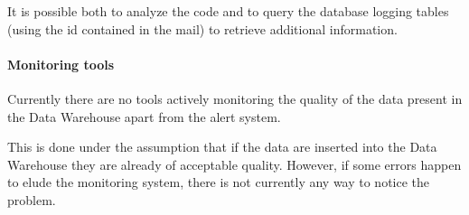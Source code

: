             It is possible both to analyze the code and to query the database logging tables (using the id contained in the mail) to retrieve additional information.
        
        \paragraph{Monitoring tools}
            Currently there are no tools actively monitoring the quality of the data present in the Data Warehouse apart from the alert system.
            
            This is done under the assumption that if the data are inserted into the Data Warehouse they are already of acceptable quality.
            However, if some errors happen to elude the monitoring system, there is not currently any way to notice the problem.